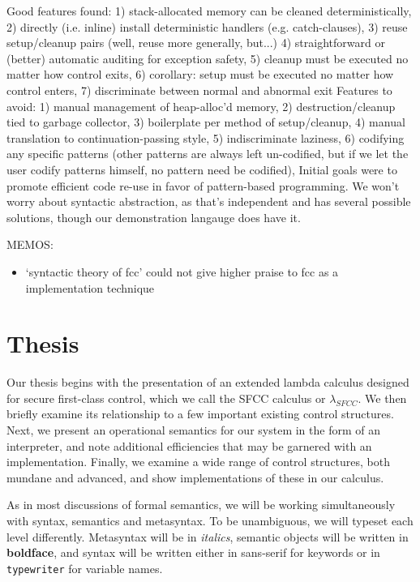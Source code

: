 \documentclass[11pt]{article}
\newcommand{\maybePage}{\newpage}
\begin{document}
Good features found:
  1) stack-allocated memory can be cleaned deterministically,
  2) directly (i.e. inline) install deterministic handlers (e.g. catch-clauses),
  3) reuse setup/cleanup pairs (well, reuse more generally, but...)
  4) straightforward or (better) automatic auditing for exception safety,
  5) cleanup must be executed no matter how control exits,
  6) corollary: setup must be executed no matter how control enters,
  7) discriminate between normal and abnormal exit
Features to avoid:
  1) manual management of heap-alloc'd memory,
  2) destruction/cleanup tied to garbage collector,
  3) boilerplate per method of setup/cleanup,
  4) manual translation to continuation-passing style,
  5) indiscriminate laziness,
  6) codifying any specific patterns (other patterns are always left un-codified, but if we let the user codify patterns himself, no pattern need be codified),
Initial goals were to promote efficient code re-use in favor of pattern-based programming.
We won't worry about syntactic abstraction, as that's independent and has several possible solutions, though our demonstration langauge does have it.


MEMOS:
\begin{itemize}
\item `syntactic theory of fcc' could not give higher praise to fcc as a implementation technique
\end{itemize}



\maybePage
\part{Thesis}

Our thesis begins with the presentation of an extended lambda calculus designed for secure first-class control, which we call the SFCC calculus or $\lambda_{SFCC}$.
We then briefly examine its relationship to a few important existing control structures.
Next, we present an operational semantics for our system in the form of an interpreter, and note additional efficiencies that may be garnered with an implementation.
Finally, we examine a wide range of control structures, both mundane and advanced, and show implementations of these in our calculus.

As in most discussions of formal semantics, we will be working simultaneously with syntax, semantics and metasyntax. To be unambiguous, we will typeset each level differently. Metasyntax will be in \textit{italics}, semantic objects will be written in \textbf{boldface}, and syntax will be written either in \textsf{sans-serif} for keywords or in \texttt{typewriter} for variable names.
\end{document}

